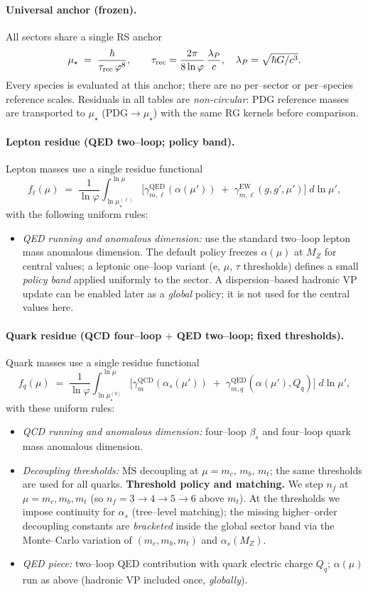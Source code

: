 \documentclass[epjc3]{svjour3}
\begin{document}
\paragraph{Universal anchor (frozen).}
All sectors share a single RS anchor
\[
\mu_\star \;=\; \frac{\hbar}{\tau_{\rm rec}\,\varphi^{8}},
\qquad
\tau_{\rm rec}=\frac{2\pi}{8\ln\varphi}\,\frac{\lambda_P}{c},
\quad \lambda_P=\sqrt{\hbar G/c^{3}}.
\]
Every species is evaluated at this anchor; there are no per–sector or per–species reference scales. Residuals in all tables are \emph{non-circular}: PDG reference masses are transported to $\mu_\star$ (PDG$\to\mu_\star$) with the same RG kernels before comparison.

\paragraph{Lepton residue (QED two–loop; policy band).}
Lepton masses use a single residue functional
\[
f_\ell(\mu)\;=\;\frac{1}{\ln\varphi}\int_{\ln\mu_\star^{(\ell)}}^{\ln\mu}
\Big[\gamma^{\text{QED}}_{m,\ell}(\alpha(\mu'))\;+\;\gamma^{\text{EW}}_{m,\ell}(g,g',\mu')\Big]\;d\ln\mu',
\]
with the following uniform rules:
\begin{itemize}
  \item \emph{QED running and anomalous dimension:} use the standard two–loop lepton mass anomalous dimension. The default policy freezes $\alpha(\mu)$ at $M_Z$ for central values; a leptonic one–loop variant (e, $\mu$, $\tau$ thresholds) defines a small \emph{policy band} applied uniformly to the sector. A dispersion–based hadronic VP update can be enabled later as a \emph{global} policy; it is not used for the central values here.
\end{itemize}

\paragraph{Quark residue (QCD four–loop $+$ QED two–loop; fixed thresholds).}
Quark masses use a single residue functional
\[
f_q(\mu)\;=\;\frac{1}{\ln\varphi}\int_{\ln\mu_\star^{(q)}}^{\ln\mu}
\Big[\gamma^{\text{QCD}}_{m}(\alpha_s(\mu'))\;+\;\gamma^{\text{QED}}_{m,q}(\alpha(\mu'),Q_q)\Big]\;d\ln\mu',
\]
with these uniform rules:
\begin{itemize}
  \item \emph{QCD running and anomalous dimension:} four–loop $\beta_s$ and four–loop quark mass anomalous dimension.
  \item \emph{Decoupling thresholds:} $\overline{\mathrm{MS}}$ decoupling at $\mu=m_c,\,m_b,\,m_t$; the same thresholds are used for all quarks.
\textbf{Threshold policy and matching.} We step $n_f$ at $\mu=m_c,m_b,m_t$ (so $n_f=3\!\to\!4\!\to\!5\!\to\!6$ above $m_t$). At the thresholds we impose continuity for $\alpha_s$ (tree–level matching); the missing higher–order decoupling constants are \emph{bracketed} inside the global sector band via the Monte–Carlo variation of $(m_c,m_b,m_t)$ and $\alpha_s(M_Z)$.
  \item \emph{QED piece:} two–loop QED contribution with quark electric charge $Q_q$; $\alpha(\mu)$ run as above (hadronic VP included once, \emph{globally}).
\end{itemize}
\end{document}
